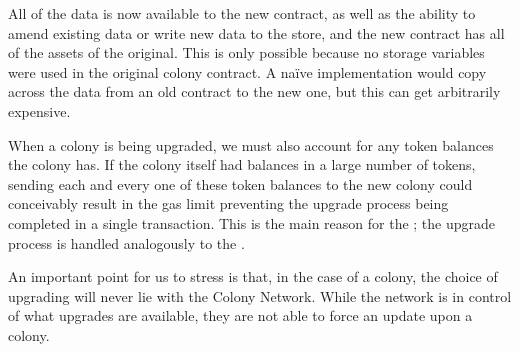 All of the data is now available to the new contract, as well as the ability to amend existing data or write new data to the store, and the new contract has all of the assets of the original. This is only possible because no storage variables were used in the original colony contract. A na{\"i}ve implementation would copy across the data from an old contract to the new one, but this can get arbitrarily expensive.

When a colony is being upgraded, we must also account for any token balances the colony has. If the colony itself had balances in a large number of tokens, sending each and every one of these token balances to the new colony could conceivably result in the gas limit preventing the upgrade process being completed in a single transaction. This is the main reason for the ; the upgrade process is handled analogously to the .

An important point for us to stress is that, in the case of a colony, the choice of upgrading will never lie with the Colony Network. While the network is in control of what upgrades are available, they are not able to force an update upon a colony.

